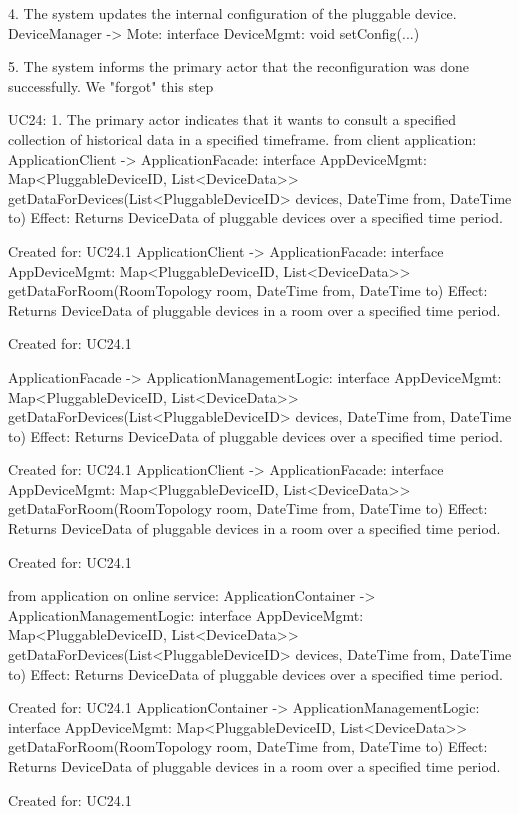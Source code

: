             4. The system updates the internal configuration of the pluggable device.
                    DeviceManager -> Mote: interface DeviceMgmt: void setConfig(...)

            5. The system informs the primary actor that the reconfiguration was done successfully.
                    We "forgot" this step

        UC24:
            1. The primary actor indicates that it wants to consult a specified collection of historical data in a specified timeframe.
                from client application:
                    ApplicationClient -> ApplicationFacade: interface AppDeviceMgmt: Map<PluggableDeviceID, List<DeviceData>> getDataForDevices(List<PluggableDeviceID> devices, DateTime from, DateTime to)
                        Effect: Returns DeviceData of pluggable devices over a specified time period.
                        \item Created for: UC24.1
                    ApplicationClient -> ApplicationFacade: interface AppDeviceMgmt: Map<PluggableDeviceID, List<DeviceData>> getDataForRoom(RoomTopology room, DateTime from, DateTime to)
                        Effect: Returns DeviceData of pluggable devices in a room over a specified time period.
                        \item Created for: UC24.1

                    ApplicationFacade -> ApplicationManagementLogic: interface AppDeviceMgmt: Map<PluggableDeviceID, List<DeviceData>> getDataForDevices(List<PluggableDeviceID> devices, DateTime from, DateTime to)
                        Effect: Returns DeviceData of pluggable devices over a specified time period.
                        \item Created for: UC24.1
                    ApplicationClient -> ApplicationFacade: interface AppDeviceMgmt: Map<PluggableDeviceID, List<DeviceData>> getDataForRoom(RoomTopology room, DateTime from, DateTime to)
                        Effect: Returns DeviceData of pluggable devices in a room over a specified time period.
                        \item Created for: UC24.1

                from application on online service:
                    ApplicationContainer -> ApplicationManagementLogic: interface AppDeviceMgmt: Map<PluggableDeviceID, List<DeviceData>> getDataForDevices(List<PluggableDeviceID> devices, DateTime from, DateTime to)
                        Effect: Returns DeviceData of pluggable devices over a specified time period.
                        \item Created for: UC24.1
                    ApplicationContainer -> ApplicationManagementLogic: interface AppDeviceMgmt: Map<PluggableDeviceID, List<DeviceData>> getDataForRoom(RoomTopology room, DateTime from, DateTime to)
                        Effect: Returns DeviceData of pluggable devices in a room over a specified time period.
                        \item Created for: UC24.1

